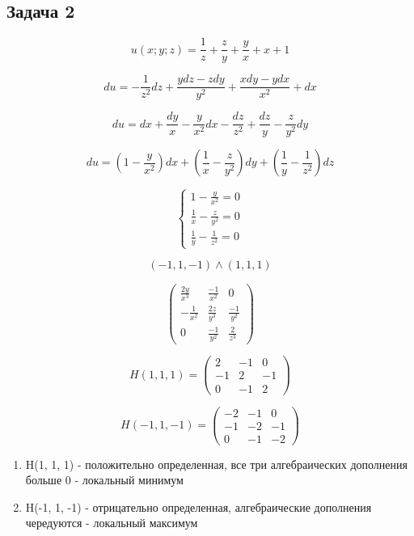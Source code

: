 \documentclass[a4paper,12pt]{article}
\begin{document}
\subsection{Задача 2}

\[
u(x; y; z) = \frac{1}{z} + \frac{z}{y} + \frac{y}{x} + x + 1
\]

\[
du = -\frac{1}{z^2}dz + \frac{ydz-zdy}{y^2} + \frac{xdy - ydx}{x^2} + dx 
\]

\[
du = dx + \frac{dy}{x} - \frac{y}{x^2} dx - \frac{dz}{z^2} + \frac{dz}{y} - \frac{z}{y^2} dy
\]

\[
du = \left(1 - \frac{y}{x^2} \right) dx + \left(\frac{1}{x} - \frac{z}{y^2} \right) dy + \left(\frac{1}{y} - \frac{1}{z^2} \right) dz
\]

\[
\begin{cases}
	1 - \frac{y}{x^2} = 0 \\
	\frac{1}{x} - \frac{z}{y^2} = 0 \\
	\frac{1}{y} - \frac{1}{z^2}  = 0
\end{cases}
\]

\[
(-1, 1, -1) \land (1, 1, 1)
\]

\[
\begin{pmatrix}
	\frac{2y}{x^3} & \frac{-1}{x^2} & 0 \\
	-\frac{1}{x^2} & \frac{2z}{y^3} & \frac{-1}{y^2} \\
	0 & \frac{-1}{y^2} & \frac{2}{z^3}
\end{pmatrix}
\]

\[
H(1, 1, 1) = 
\begin{pmatrix}
	2& -1& 0 \\
	-1& 2& -1 \\
	0 &-1& 2 
\end{pmatrix}
\]

\[
H(-1, 1, -1) = 
\begin{pmatrix}
	-2& -1& 0 \\
	-1& -2& -1 \\
	0 &-1& -2 
\end{pmatrix}
\]

\begin{enumerate}
	\item H(1, 1, 1)  - положительно определенная, все три алгебраических дополнения больше 0 - локальный минимум
	\item H(-1, 1, -1) - отрицательно определенная, алгебраические дополнения чередуются - локальный максимум
\end{enumerate}
\end{document}
